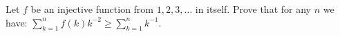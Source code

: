 Let $f$ be an injective function from ${1,2,3,\ldots}$ in itself. Prove that for any $n$ we have: $\sum_{k=1}^{n} f(k)k^{-2} \geq \sum_{k=1}^{n} k^{-1}.$